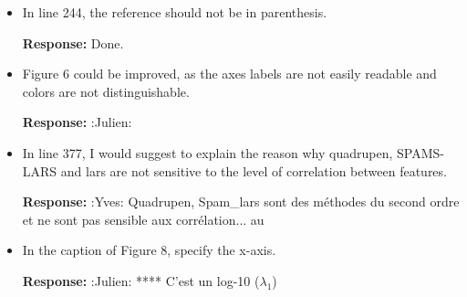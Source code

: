\documentclass[a4paper,11pt]{texMemo}
\newenvironment{comment}
{
   \par\medskip \color{black}%
   \textbf{Response: }}
{\medskip}
\newenvironment{remark}
{\begin{itshape} \color{gray}}
{\end{itshape}}
\begin{document}
\begin{itemize}
 \begin{comment}
We followed the recommandation and  improve the illustration of difference in support recovery (Figure 8) in using True Postive and False Negative and F-measure (with the corresponding citation of \cite{gasso2009recovering}).
\end{comment}

\item 
  \begin{remark}
    In line 244, %
   the reference should not be in parenthesis.
  \end{remark}

  \begin{comment}
    Done.
  \end{comment}




\item 
  \begin{remark}
    Figure 6 could be improved, 
as the axes labels are not easily readable and colors are not
distinguishable.
\end{remark}

\begin{comment}
  :Julien:
\end{comment}



\item
   \begin{remark}
    In line 377,                                                       
I would suggest to explain the reason why quadrupen, SPAMS-LARS and lars are not
sensitive to the level of correlation between features.
    \end{remark}

\begin{comment}
  :Yves:
   Quadrupen, Spam\_lars sont des méthodes du second ordre et ne sont pas sensible aux corrélation... au
\end{comment}


\item
  \begin{remark}
    In the caption of Figure 8, specify the x-axis.
  \end{remark}
  
\begin{comment}
    :Julien: 
**** C'est un log-10 ($\lambda_1$)
\end{comment}

\end{itemize}
\end{document}
